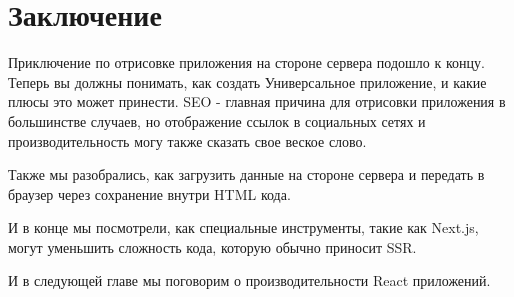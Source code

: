 \section{Заключение}

Приключение по отрисовке приложения на стороне сервера подошло к концу. Теперь вы должны понимать, как создать Универсальное приложение, и какие плюсы это может принести. SEO - главная причина для отрисовки приложения в большинстве случаев, но отображение ссылок в социальных сетях и производительность могу также сказать свое веское слово.

Также мы разобрались, как загрузить данные на стороне сервера и передать в браузер через сохранение внутри HTML кода.

И в конце мы посмотрели, как специальные инструменты, такие как Next.js, могут уменьшить сложность кода, которую обычно приносит SSR.

И в следующей главе мы поговорим о производительности React приложений.






